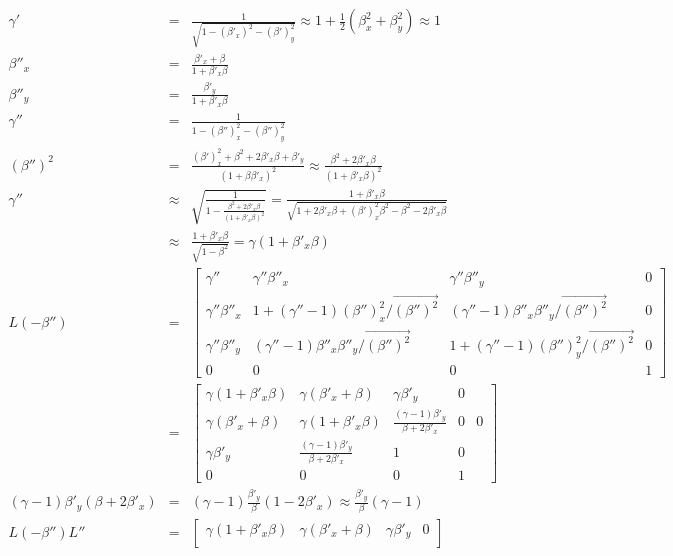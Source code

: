 \documentclass[11pt]{amsart}
\begin{document}
\begin{eqnarray*}
\gamma' &=& \frac{1}{\sqrt{1-(\beta'_{x})^{2}-(\beta')_{y}^{2}}} \approx 1+\frac{1}{2}(\beta_{x}^{2}+\beta_{y}^{2}) \approx 1 \\
\beta''_{x} &=& \frac{\beta'_{x}+\beta}{1+\beta'_{x}\beta} \\
\beta''_{y} &=& \frac{\beta'_{y}}{1+\beta'_{x}\beta} \\
\gamma'' &=& \frac{1}{1-(\beta'')_{x}^{2}-(\beta'')_{y}^{2}} \\
(\beta'')^{2} &=& \frac{(\beta')_{x}^{2}+\beta^{2}+2\beta'_{x}\beta+\beta'_{y}}{(1+\beta\beta'_{x})^{2}} \approx \frac{\beta^{2}+2\beta'_{x}\beta}{(1+\beta'_{x}\beta)^{2}} \\
\gamma'' &\approx& \sqrt{\frac{1}{1-\frac{\beta^{2}+2\beta'_{x}\beta}{(1+\beta'_{x}\beta)^{2}}}} = \frac{1+\beta'_{x}\beta}{\sqrt{1+2\beta'_{x}\beta+(\beta')_{x}^{2}\beta^{2}-\beta^{2}-2\beta'_{x}\beta}} \\
&\approx& \frac{1+\beta'_{x}\beta}{\sqrt{1-\beta^{2}}}  = \gamma(1+\beta'_{x}\beta) \\
L(-\beta'') &=&  \begin{bmatrix}
	\gamma'' & \gamma''\beta''_{x} & \gamma''\beta''_{y} & 0 \\
	\gamma''\beta''_{x} & 1+(\gamma''-1)(\beta'')_{x}^{2}/\vec{(\beta'')^{2}} & (\gamma''-1)\beta''_{x}\beta''_{y}/\vec{(\beta'')^{2}} & 0 \\
	\gamma''\beta''_{y} &  (\gamma''-1)\beta''_{x}\beta''_{y}/\vec{(\beta'')^{2}} & 1+(\gamma''-1)(\beta'')_{y}^{2}/\vec{(\beta'')^{2}} & 0 \\
	0 & 0 & 0 & 1 
	\end{bmatrix} \\
&=& \begin{bmatrix}
	\gamma(1+\beta'_{x}\beta) & \gamma(\beta'_{x}+\beta) & \gamma\beta'_{y} & 0 \\
	\gamma(\beta'_{x}+\beta) & \gamma(1+\beta'_{x}\beta) & \frac{(\gamma-1)\beta'_{y}}{\beta+2\beta'_{x}} & 0 & 0 \\
	 \gamma\beta'_{y} &  \frac{(\gamma-1)\beta'_{y}}{\beta+2\beta'_{x}} & 1 & 0 \\
0 & 0 & 0 & 1 
\end{bmatrix}  \\
(\gamma-1)\beta'_{y}(\beta+2\beta'_{x}) &=& (\gamma-1)\frac{\beta'_{y}}{\beta}(1-2\beta'_{x}) \approx \frac{\beta'_{y}}{\beta}(\gamma-1) \\
L(-\beta'')L'' &=& \begin{bmatrix}
	\gamma(1+\beta'_{x}\beta) & \gamma(\beta'_{x}+\beta) & \gamma\beta'_{y} & 0 \\

\end{bmatrix}
\end{eqnarray*}
\end{document}
